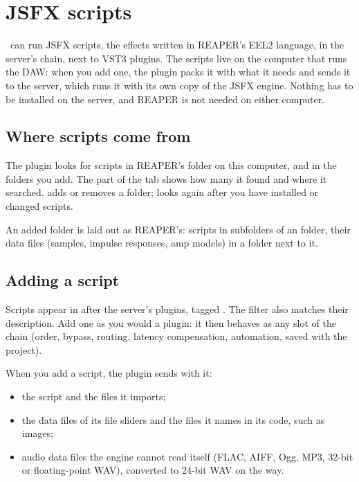\chapter{JSFX scripts}
\label{ch:jsfx}

\fxme\ can run JSFX scripts, the effects written in REAPER's EEL2 language,
in the server's chain, next to VST3 plugins. The scripts live on the computer
that runs the DAW: when you add one, the plugin packs it with what it needs
and sends it to the server, which runs it with its own copy of the JSFX
engine. Nothing has to be installed on the server, and REAPER is not needed
on either computer.

\section{Where scripts come from}

The plugin looks for scripts in REAPER's  folder on this
computer, and in the folders you add. The  part of the
 tab shows how many it found and where it searched.
 adds or removes a folder;  looks again after you
have installed or changed scripts.

An added folder is laid out as REAPER's: scripts in subfolders of an
 folder, their data files (samples, impulse responses, amp
models) in a  folder next to it.

\section{Adding a script}

Scripts appear in  after the server's plugins, tagged
. The filter also matches their description. Add one as you would a
plugin: it then behaves as any slot of the chain (order, bypass, routing,
latency compensation, automation, saved with the project).

When you add a script, the plugin sends with it:

\begin{itemize}
  \item the script and the files it imports;
  \item the data files of its file sliders and the files it names in its
    code, such as images;
  \item audio data files the engine cannot read itself (FLAC, AIFF, Ogg,
    MP3, 32-bit or floating-point WAV), converted to 24-bit WAV on the way.
\end{itemize}


